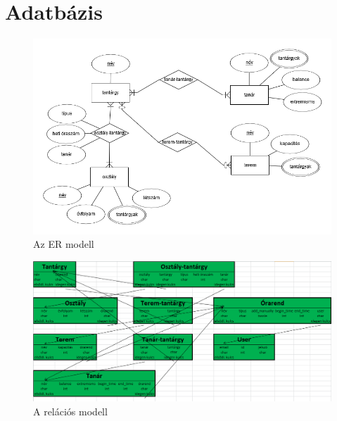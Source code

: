 \section{Adatbázis}

\begin{figure}
\includegraphics[width=\linewidth]{images/ermodell.png}
\caption{Az ER modell}
\end{figure}

\begin{figure}
\includegraphics[width=\linewidth]{images/relmodell.png}
\caption{A relációs modell}
\end{figure}

